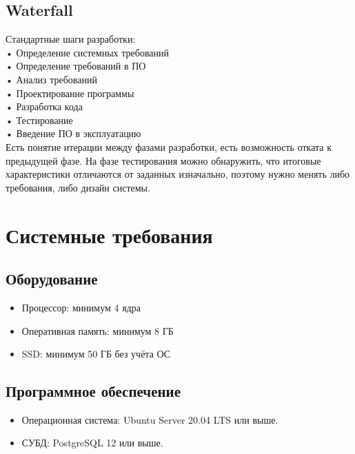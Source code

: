 \documentclass{article}
\begin{document}
\subsection{Waterfall}
Стандартные шаги разработки:\\
• Определение системных требований \\
• Определение требований в ПО\\
• Анализ требований\\
• Проектирование программы\\
• Разработка кода\\
• Тестирование\\
• Введение ПО в эксплуатацию\\
Есть понятие итерации между фазами разработки, есть возможность отката к предыдущей фазе. На фазе тестирования можно обнаружить, что итоговые характеристики отличаются от заданных изначально, поэтому нужно менять либо требования, либо дизайн системы.

\section{Системные требования}
\subsection{Оборудование}

\begin{itemize}
    \item Процессор: минимум 4 ядра
    \item Оперативная память: минимум 8 ГБ
    \item SSD: минимум 50 ГБ без учёта ОС
\end{itemize}

\subsection{Программное обеспечение}

\begin{itemize}
    \item Операционная система: Ubuntu Server 20.04 LTS или выше.
    \item СУБД: PostgreSQL 12 или выше.
\end{itemize}
\end{document}
